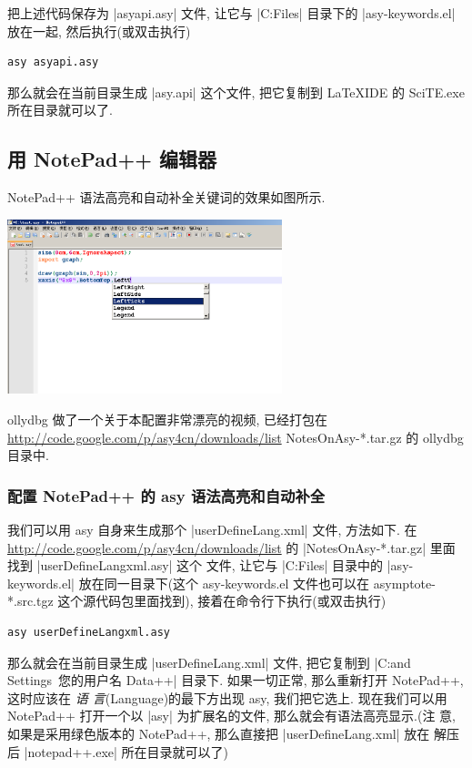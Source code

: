 \documentclass[nofonts,CJKnormalspaces]{ctexbook}
\begin{document}


把上述代码保存为 |asyapi.asy| 文件, 让它与 |C:\Program Files\Asymptote|
目录下的 |asy-keywords.el| 放在一起, 然后执行(或双击执行)
\begin{verbatim}
asy asyapi.asy
\end{verbatim}
那么就会在当前目录生成 |asy.api| 这个文件, 把它复制到 LaTeXIDE 的
SciTE.exe 所在目录就可以了.

\subsection{用 NotePad++ 编辑器}
NotePad++ 语法高亮和自动补全关键词的效果如图所示.
\begin{center}
  \includegraphics[width=0.6\textwidth]{NotePad++0.png}
\end{center}
ollydbg 做了一个关于本配置非常漂亮的视频, 已经打包在
\url{http://code.google.com/p/asy4cn/downloads/list}
NotesOnAsy-*.tar.gz 的 ollydbg 目录中.

\subsubsection{配置 NotePad++ 的 asy 语法高亮和自动补全}
我们可以用 asy 自身来生成那个 |userDefineLang.xml| 文件, 方法如下.
在 \url{http://code.google.com/p/asy4cn/downloads/list} 的
|NotesOnAsy-*.tar.gz| 里面找到 |userDefineLangxml.asy| 这个
文件, 让它与 |C:\Program Files\Asymptote| 目录中的 |asy-keywords.el|
放在同一目录下(这个 asy-keywords.el 文件也可以在 asymptote-*.src.tgz
这个源代码包里面找到), 接着在命令行下执行(或双击执行)
\begin{verbatim}
asy userDefineLangxml.asy
\end{verbatim}
那么就会在当前目录生成 |userDefineLang.xml| 文件, 把它复制到
|C:\Documents and Settings\ 您的用户名 \Application Data\Notepad++|
目录下. 如果一切正常, 那么重新打开 NotePad++, 这时应该在 \emph{语
  言}(Language)的最下方出现 asy, 我们把它选上. 现在我们可以用
NotePad++ 打开一个以 |asy| 为扩展名的文件, 那么就会有语法高亮显示.(注
意, 如果是采用绿色版本的 NotePad++, 那么直接把 |userDefineLang.xml| 放在
解压后 |notepad++.exe| 所在目录就可以了)
\end{document}
